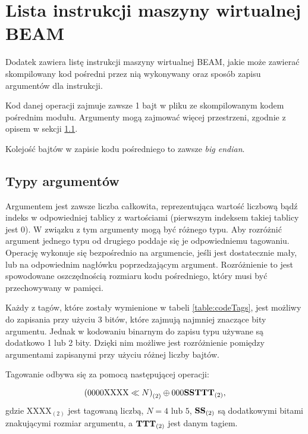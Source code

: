 \chapter{Lista instrukcji maszyny wirtualnej BEAM}
\label{cha:operacjeBeam}

Dodatek zawiera listę instrukcji maszyny wirtualnej BEAM, jakie może zawierać skompilowany kod pośredni przez nią wykonywany oraz sposób zapisu argumentów dla instrukcji.

Kod danej operacji zajmuje zawsze 1 bajt w pliku ze skompilowanym kodem pośrednim modułu. 
Argumenty mogą zajmować więcej przestrzeni, zgodnie z opisem w sekcji \ref{sec:opsTypes}.

Kolejość bajtów w zapisie kodu pośredniego to zawsze \emph{big endian}.


\section{Typy argumentów}
\label{sec:opsTypes}
Argumentem jest zawsze liczba całkowita, reprezentująca wartość liczbową bądź indeks w odpowiedniej tablicy z wartościami (pierwszym indeksem takiej tablicy jest 0). W związku z tym argumenty mogą być różnego typu. Aby rozróżnić argument jednego typu od drugiego poddaje się je odpowiedniemu tagowaniu. Operację wykonuje się bezpośrednio na argumencie, jeśli jest dostatecznie mały, lub na odpowiednim nagłówku poprzedzającym argument. Rozróżnienie to jest spowodowane oszczędnością rozmiaru kodu pośredniego, który musi być przechowywany w pamięci.

Każdy z tagów, które zostały wymienione w tabeli \ref{table:codeTags}, jest możliwy do zapisania przy użyciu 3 bitów, które zajmują najmniej znaczące bity argumentu.
Jednak w kodowaniu binarnym do zapisu typu używane są dodatkowo 1 lub 2 bity. Dzięki nim możliwe jest rozróżnienie pomiędzy argumentami zapisanymi przy użyciu różnej liczby bajtów.

Tagowanie odbywa się za pomocą następującej operacji:

$${(0000\text{XXXX} \ll N)}_{(2)} \oplus {000\text{\textbf{SS}}\text{\textbf{TTT}}}_{(2)},$$
gdzie $\text{XXXX}_{(2)}$ jest tagowaną liczbą, 
$N=4 \text{ lub } 5$, 
$\text{\textbf{SS}}_{(2)}$ są dodatkowymi bitami znakującymi rozmiar argumentu, a
$\text{\textbf{TTT}}_{(2)}$ jest danym tagiem.

